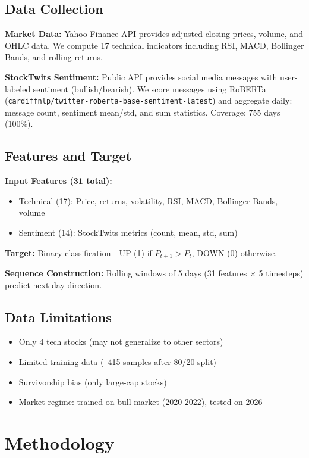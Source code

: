 \documentclass[10pt,twocolumn]{article}
\begin{document}
\subsection{Data Collection}

\textbf{Market Data:} Yahoo Finance API provides adjusted closing prices, volume, and OHLC data. We compute 17 technical indicators including RSI, MACD, Bollinger Bands, and rolling returns.

\textbf{StockTwits Sentiment:} Public API provides social media messages with user-labeled sentiment (bullish/bearish). We score messages using RoBERTa (\texttt{cardiffnlp/twitter-roberta-base-sentiment-latest}) and aggregate daily: message count, sentiment mean/std, and sum statistics. Coverage: 755 days (100\%).

\subsection{Features and Target}

\textbf{Input Features (31 total):}
\begin{itemize}
\item Technical (17): Price, returns, volatility, RSI, MACD, Bollinger Bands, volume
\item Sentiment (14): StockTwits metrics (count, mean, std, sum)
\end{itemize}

\textbf{Target:} Binary classification - UP (1) if $P_{t+1} > P_t$, DOWN (0) otherwise.

\textbf{Sequence Construction:} Rolling windows of 5 days (31 features × 5 timesteps) predict next-day direction.

\subsection{Data Limitations}

\begin{itemize}
\item Only 4 tech stocks (may not generalize to other sectors)
\item Limited training data (~415 samples after 80/20 split)
\item Survivorship bias (only large-cap stocks)
\item Market regime: trained on bull market (2020-2022), tested on 2026
\end{itemize}

\section{Methodology}
\end{document}
